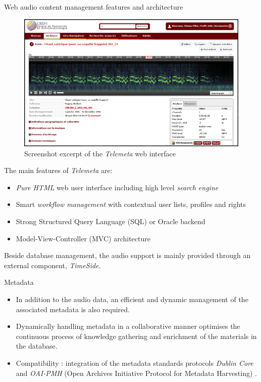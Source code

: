 \documentclass[final, hyperref, table]{beamer}
\begin{document}
\begin{frame}[containsverbatim]{}
\begin{columns}[t]
\begin{column}[T]{.49\linewidth}
\begin{block}{Web audio content management features and architecture}
\begin{figure}[htbp]
  \centering
  \includegraphics[width=0.4\paperwidth]{../img/telemeta.png}
  \caption{Screenshot excerpt of the \emph{Telemeta} web interface}
\end{figure}



The main features of \emph{Telemeta} are:
\vspace{-0.1cm}
\begin{itemize}
\item \emph{Pure HTML} web user interface including high level \emph{search engine}
\item Smart \emph{workflow management} with contextual user lists, profiles and rights
\item Strong Structured Query Language (SQL) or Oracle backend
\item Model-View-Controller (MVC) architecture 
\end{itemize}
Beside database management, the audio support is mainly provided through an external component, \emph{TimeSide}.

\end{block}
\begin{block}{Metadata}
  \begin{itemize}
  \item In addition to the audio data, an efficient and dynamic
    management of the associated metadata is also required.
  \item Dynamically handling metadata in a collaborative manner optimises
    the continuous process of knowledge gathering and enrichment of
    the materials in the database.
  \item Compatibility : integration of the metadata standards protocols \emph{Dublin Core}
    and \emph{OAI-PMH} (Open Archives Initiative Protocol for Metadata
    Harvesting) \cite{DublinCore,OAI-PMH}.
  \end{itemize}


\end{block}
\end{column}
\end{columns}
\end{frame}
\end{document}
